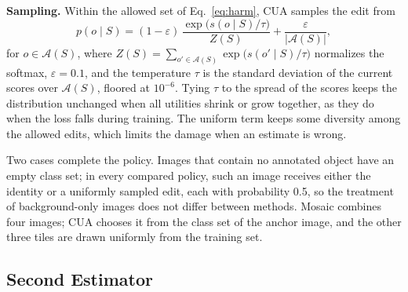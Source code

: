 \documentclass[conference]{IEEEtran}
\begin{document}
\noindent\textbf{Sampling.} Within the allowed set of Eq.~\eqref{eq:harm}, CUA samples the edit from
\begin{equation}
p(o\mid S)=(1-\varepsilon)\,\frac{\exp\bigl(s(o\mid S)/\tau\bigr)}{Z(S)}+\frac{\varepsilon}{|\mathcal{A}(S)|},
\label{eq:sampling}
\end{equation}
for $o\in\mathcal{A}(S)$, where $Z(S)=\sum_{o'\in\mathcal{A}(S)}\exp\bigl(s(o'\mid S)/\tau\bigr)$ normalizes the softmax, $\varepsilon=0.1$, and the temperature $\tau$ is the standard deviation of the current scores over $\mathcal{A}(S)$, floored at $10^{-6}$. Tying $\tau$ to the spread of the scores keeps the distribution unchanged when all utilities shrink or grow together, as they do when the loss falls during training. The uniform term keeps some diversity among the allowed edits, which limits the damage when an estimate is wrong.

Two cases complete the policy. Images that contain no annotated object have an empty class set; in every compared policy, such an image receives either the identity or a uniformly sampled edit, each with probability 0.5, so the treatment of background-only images does not differ between methods. Mosaic combines four images; CUA chooses it from the class set of the anchor image, and the other three tiles are drawn uniformly from the training set.

\subsection{Second Estimator}
\label{app:cua_v2}
\end{document}
